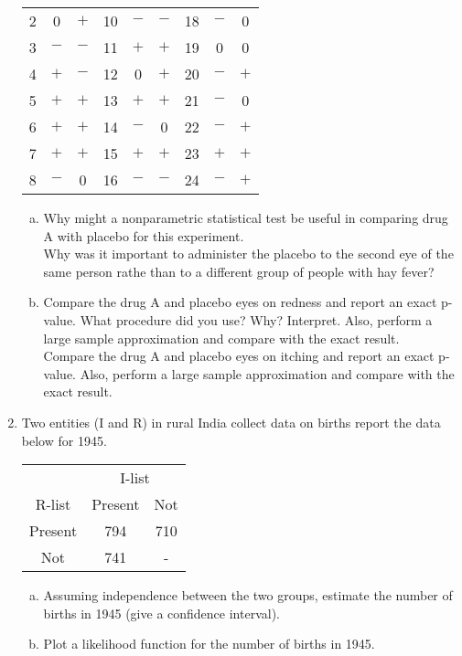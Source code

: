 \documentclass[12pt]{article}
\begin{document}
\begin{enumerate}[Problem 1.]
\begin{center}
\begin{tabular}{ccccccccc}
2 & 0 & $+$   & 10 & $-$ & $-$ & 18 & $-$ & 0 \\
3 & $-$ & $-$ & 11 & $+$ & $+$ & 19 & 0   & 0 \\
4 & $+$ & $-$ & 12 & 0 & $+$ & 20   & $-$ & $+$ \\
5 & $+$ & $+$ & 13 & $+$ & $+$ & 21 & $-$ & 0 \\
6 & $+$ & $+$ & 14 & $-$ & 0 & 22 & $-$ & $+$ \\
7 & $+$ & $+$ & 15 & $+$ & $+$ & 23 & $+$ & $+$ \\
8 & $-$ & 0 & 16 & $-$ & $-$ & 24 & $-$ & $+$
\\ \hline
\end{tabular}
\end{center}
\begin{enumerate}[a.]
\item Why might a nonparametric statistical test be useful in comparing
drug A with placebo for this experiment.
\\
Why was it important to administer the placebo to the second eye of the same 
person rathe than to a different group of people with hay fever?
\item Compare the drug A and placebo eyes on redness and report an exact
p-value.  What procedure did you use?  Why?  Interpret. Also, perform a large
sample approximation and compare with the exact result. \\
Compare the drug A and placebo eyes on itching and report an exact p-value.
Also, perform a large sample approximation and compare with the exact result.
\end{enumerate}
\item Two entities (I and R) in rural India collect data on births report the
  data below for 1945.
  \begin{center}
    \begin{tabular}{ccc}
          & \multicolumn{2}{c}{I-list}  \\
R-list    & Present & Not \\ \hline
 Present  &  794    & 710 \\ 
    Not   &  741    &  -  \\ \hline
    \end{tabular}
  \end{center}
  \begin{enumerate}[a.]
  \item Assuming independence between the two groups, estimate the number
    of births in 1945 (give a confidence interval).
  \item Plot a likelihood function for the number of births in 1945.
  \end{enumerate}
\end{enumerate}
\end{document}
